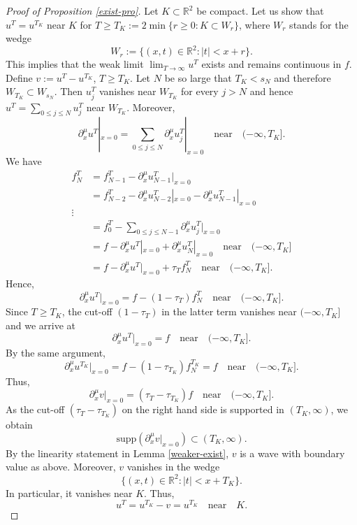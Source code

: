 \documentclass[10pt,a4paper]{article}
\theoremstyle{plain}
\theoremstyle{definition}
\theoremstyle{remark}
\numberwithin{equation}{section}
\newcommand{\R}{\mathbb{R}}
\begin{document}
\begin{proof}[Proof of Proposition \ref{exist-pro}]
{
Let $K \subset \R^2 $ be compact. 
Let us show that $u^T = u^{T_K}$ near $K$ for 
$T \geq  T_K := 2\min \{ r \geq 0 : K  \subset W_r \}$, where $W_r  $ stands for the wedge 
\[
W_r := \{ (x,t) \in \R^2 : |t| < x+r\}.
\]
This implies that the weak limit $\lim_{T \to \infty} u^T$ exists and remains continuous in $f$. 
Define $v:= u^T-u^{T_K}$, $T \geq T_K$. 
Let $N$ be so large that  $T_K < s_N $ and therefore $W_{T_K} \subset W_{s_N}$. 
Then $u_j^T $  vanishes near $W_{T_K}$ for every $j > N$ and hence $u^T = \sum_{0\leq j \leq N} u_j^T$ near $W_{T_K} $. 
Moreover, 
\[
\partial_x^\mu u^T |_{x=0} = \sum_{0\leq j \leq N} \partial_x^\mu u_j^T|_{x=0} \quad \text{near} \quad  (-\infty,T_K].
\]
We have 
\begin{align}
f_N^T &= f_{N-1}^T - \partial_x^\mu u_{N-1}^T|_{x=0}   \\
&= f_{N-2}^T - \partial_x^\mu u_{N-2}^T|_{x=0} - \partial_x^\mu u_{N-1}^T |_{x=0}  \\
\vdots 
\\
&=  f_0^T - \sum_{0 \leq j\leq N-1} \partial_x^\mu u_{j}^T  |_{x=0} 
\\
&=   f -  \partial_x^\mu u^T |_{x=0} + \partial_x^\mu
u_N^T|_{x=0} \quad \text{near} \quad  (-\infty,T_K]
\\
&=   f -  \partial_x^\mu u^T |_{x=0} + \tau_T f_N^T \quad \text{near} \quad  (-\infty,T_K].
\end{align}
Hence,
\[
 \partial_x^\mu u^T |_{x=0}  = f   -  (1-\tau_T) f_N^T  \quad  \text{near} \quad   (-\infty, T_K].
\]
Since $T \geq T_K$, the cut-off $(1-\tau_T)$ in the latter term vanishes near $(-\infty, T_K]$ and we arrive at 
\begin{equation}\label{qoo}
 \partial_x^\mu u^T |_{x=0}  = f   \quad  \text{near} \quad   (-\infty, T_K].
\end{equation}
By the same argument, 
\[
 \partial_x^\mu u^{T_K} |_{x=0} =  f-  (1-\tau_{T_K}) f_N^{T_K}  = f  \quad  \text{near} \quad   (-\infty, T_{K}].  
\]
Thus, 
\[
\partial_x^\mu v|_{x=0}  = (\tau_T- \tau_{T_K}) f   
\quad  \text{near} \quad   (-\infty, T_K].
\]
As the cut-off $(\tau_T- \tau_{T_K})$ on the right hand side is supported in $(T_K , \infty)$, we obtain  
\[
\text{supp} (\partial_{x}^\mu v |_{x=0}) \subset (T_K , \infty). 
\]
By the linearity statement in Lemma \ref{weaker-exist}, $v$ is a wave with boundary value as above.
Moreover, $v$ vanishes in the wedge 
\[
 \{ (x,t) \in \R^2 : |t| <x +T_K\} .
 \]
In particular, it vanishes near $K$. 
Thus, 
\[
u^T = u^{T_K} - v = u^{T_K} \quad \text{near} \quad K.
\]

}
\end{proof}
\end{document}
